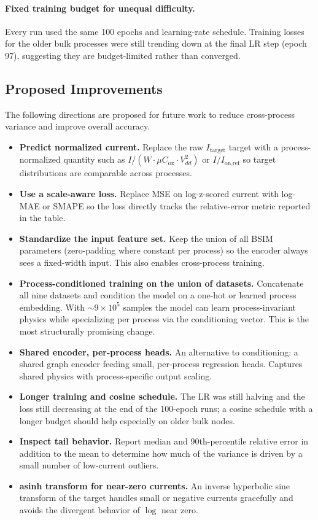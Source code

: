 \paragraph{Fixed training budget for unequal difficulty.}
Every run used the same 100 epochs and learning-rate schedule. Training
losses for the older bulk processes were still trending down at the final
LR step (epoch 97), suggesting they are budget-limited rather than
converged.

\subsection{Proposed Improvements}
\label{sec:future-improvements}

The following directions are proposed for future work to reduce
cross-process variance and improve overall accuracy.

\begin{itemize}
  \item \textbf{Predict normalized current.} Replace the raw
    $I_{\text{target}}$ target with a process-normalized quantity such as
    $I / (W \cdot \mu C_{\text{ox}} \cdot V_{dd}^2)$ or $I / I_{\text{on,ref}}$
    so target distributions are comparable across processes.
  \item \textbf{Use a scale-aware loss.} Replace MSE on log-z-scored current
    with log-MAE or SMAPE so the loss directly tracks the relative-error
    metric reported in the table.
  \item \textbf{Standardize the input feature set.} Keep the union of all
    BSIM parameters (zero-padding where constant per process) so the
    encoder always sees a fixed-width input. This also enables
    cross-process training.
  \item \textbf{Process-conditioned training on the union of datasets.}
    Concatenate all nine datasets and condition the model on a one-hot or
    learned process embedding. With $\sim 9 \times 10^5$ samples the model
    can learn process-invariant physics while specializing per process via
    the conditioning vector. This is the most structurally promising
    change.
  \item \textbf{Shared encoder, per-process heads.} An alternative to
    conditioning: a shared graph encoder feeding small, per-process
    regression heads. Captures shared physics with process-specific output
    scaling.
  \item \textbf{Longer training and cosine schedule.} The LR was still
    halving and the loss still decreasing at the end of the 100-epoch
    runs; a cosine schedule with a longer budget should help especially on
    older bulk nodes.
  \item \textbf{Inspect tail behavior.} Report median and 90th-percentile
    relative error in addition to the mean to determine how much of the
    variance is driven by a small number of low-current outliers.
  \item \textbf{asinh transform for near-zero currents.} An inverse
    hyperbolic sine transform of the target handles small or negative
    currents gracefully and avoids the divergent behavior of $\log$ near
    zero.
\end{itemize}

